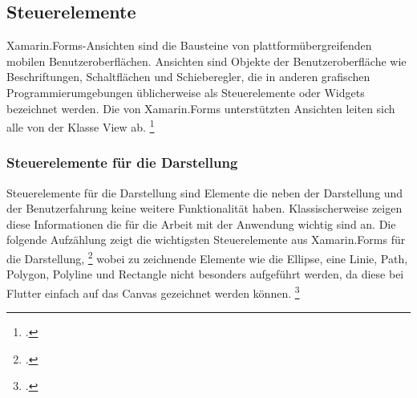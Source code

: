 \subsection{Steuerelemente}

Xamarin.Forms-Ansichten sind die Bausteine von plattformübergreifenden mobilen Benutzeroberflächen. Ansichten sind Objekte der Benutzeroberfläche wie Beschriftungen, Schaltflächen und Schieberegler, die in anderen grafischen Programmierumgebungen üblicherweise als Steuerelemente oder Widgets bezeichnet werden. Die von Xamarin.Forms unterstützten Ansichten leiten sich alle von der Klasse View ab. \footcite[Vgl.][Abgerufen am \today]{MicrosoftXamViews2020}

\subsubsection{Steuerelemente für die Darstellung}
Steuerelemente für die Darstellung sind Elemente die neben der Darstellung und der Benutzerfahrung keine weitere Funktionalität haben. Klassischerweise zeigen diese Informationen die für die Arbeit mit der Anwendung wichtig sind an.  Die folgende Aufzählung zeigt die wichtigsten Steuerelemente aus Xamarin.Forms für die Darstellung, \footcite[Vgl.][Abgerufen am \today]{MicrosoftXamLayouts2018} wobei zu zeichnende Elemente wie die Ellipse,  eine Linie,  Path,  Polygon, Polyline und Rectangle nicht besonders aufgeführt werden, da diese bei Flutter einfach auf das Canvas gezeichnet werden können.  \footcite[Vgl.][Abgerufen am \today]{GoogleFlutterCanvas2020}

